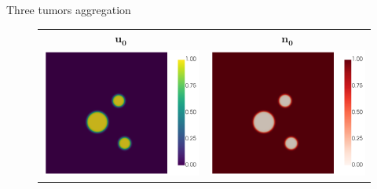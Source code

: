 \begin{frame}{Three tumors aggregation}

	\begin{figure}
		\centering
		\begin{tabular}{cc}
			\hspace*{-0.9cm}$\boldsymbol{u_0}$ & \hspace*{-0.9cm}$\boldsymbol{n_0}$\\
			\includegraphics[scale=0.2]{img/three_tumors/initial_cond/tumor_DG-UPW_Pi1_u_i-0_cropped.png} &
			\includegraphics[scale=0.2]{img/three_tumors/initial_cond/tumor_DG-UPW_Pi1_n_i-0_cropped.png}

\end{tabular}
\end{figure}
\end{frame}
